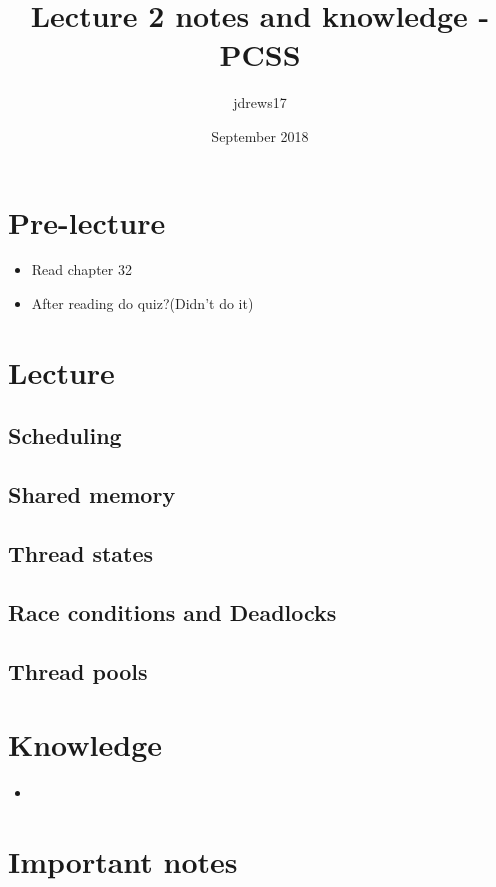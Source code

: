 \documentclass{article}
\title{Lecture 2 notes and knowledge - PCSS}
\author{jdrews17}
\date{September 2018}
\begin{document}
\maketitle
\newpage

\section{Pre-lecture}
\begin{itemize}
  \item Read chapter 32
  \item After reading do quiz?(Didn't do it)
\end{itemize}

\section{Lecture}
\subsection{Scheduling}

\subsection{Shared memory}

\subsection{Thread states}

\subsection{Race conditions and Deadlocks}

\subsection{Thread pools}


\section{Knowledge}
\begin{itemize}
  \item
\end{itemize}

\section{Important notes}
\end{document}
